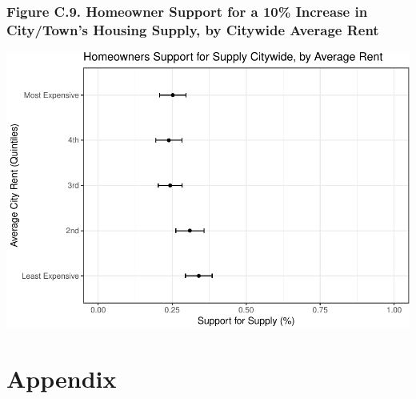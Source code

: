 \documentclass[]{article}
\begin{document}
\hypertarget{figure-c.9.-homeowner-support-for-a-10-increase-in-citytowns-housing-supply-by-citywide-average-rent}{%
\subsubsection{Figure C.9. Homeowner Support for a 10\% Increase in City/Town's Housing Supply, by Citywide Average Rent}\label{figure-c.9.-homeowner-support-for-a-10-increase-in-citytowns-housing-supply-by-citywide-average-rent}}

\includegraphics{Zheng-Ruth-Renters-Paper_files/figure-latex/Print Figure C.9-1.pdf}

\hypertarget{appendix}{%
\section{Appendix}\label{appendix}}
\end{document}
